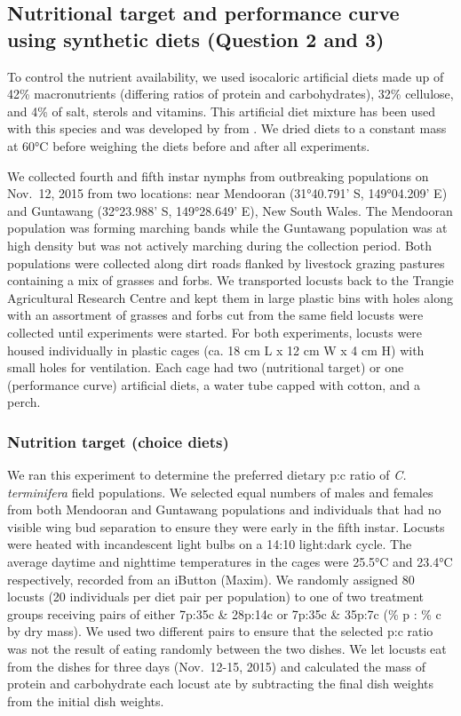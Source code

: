 \documentclass[
]{article}
\begin{document}
\subsection{Nutritional target and performance curve using synthetic
diets (Question 2 and
3)}\label{nutritional-target-and-performance-curve-using-synthetic-diets-question-2-and-3}

To control the nutrient availability, we used isocaloric artificial
diets made up of 42\% macronutrients (differing ratios of protein and
carbohydrates), 32\% cellulose, and 4\% of salt, sterols and vitamins.
This artificial diet mixture has been used with this species
\citep{clissold_regulation_2014} and was developed by
\citet{simpson_compensation_1985} from \citet{dadd_nutritional_1961}. We
dried diets to a constant mass at 60°C before weighing the diets before
and after all experiments.

We collected fourth and fifth instar nymphs from outbreaking populations
on Nov.~12, 2015 from two locations: near Mendooran (31°40.791' S,
149°04.209' E) and Guntawang (32°23.988' S, 149°28.649' E), New South
Wales. The Mendooran population was forming marching bands while the
Guntawang population was at high density but was not actively marching
during the collection period. Both populations were collected along dirt
roads flanked by livestock grazing pastures containing a mix of grasses
and forbs. We transported locusts back to the Trangie Agricultural
Research Centre and kept them in large plastic bins with holes along
with an assortment of grasses and forbs cut from the same field locusts
were collected until experiments were started. For both experiments,
locusts were housed individually in plastic cages (ca. 18 cm L x 12 cm W
x 4 cm H) with small holes for ventilation. Each cage had two
(nutritional target) or one (performance curve) artificial diets, a
water tube capped with cotton, and a perch.

\subsubsection{Nutrition target (choice
diets)}\label{nutrition-target-choice-diets}

We ran this experiment to determine the preferred dietary p:c ratio of
\emph{C. terminifera} field populations. We selected equal numbers of
males and females from both Mendooran and Guntawang populations and
individuals that had no visible wing bud separation to ensure they were
early in the fifth instar. Locusts were heated with incandescent light
bulbs on a 14:10 light:dark cycle. The average daytime and nighttime
temperatures in the cages were 25.5°C and 23.4°C respectively, recorded
from an iButton (Maxim). We randomly assigned 80 locusts (20 individuals
per diet pair per population) to one of two treatment groups receiving
pairs of either 7p:35c \& 28p:14c or 7p:35c \& 35p:7c (\% p : \% c by
dry mass). We used two different pairs to ensure that the selected p:c
ratio was not the result of eating randomly between the two dishes. We
let locusts eat from the dishes for three days (Nov.~12-15, 2015) and
calculated the mass of protein and carbohydrate each locust ate by
subtracting the final dish weights from the initial dish weights.
\end{document}
